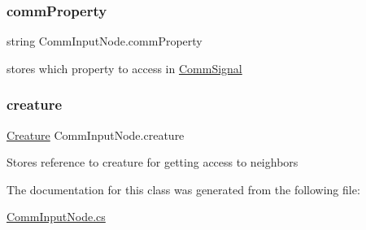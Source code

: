 \subsubsection{\texorpdfstring{comm\+Property}{commProperty}}
{\footnotesize\ttfamily string Comm\+Input\+Node.\+comm\+Property}



stores which property to access in \mbox{\hyperlink{class_comm_signal}{Comm\+Signal}} 

\mbox{\label{class_comm_input_node_ac72fbeea2e0341d3caaddd99f9a71cb6}} 
\subsubsection{\texorpdfstring{creature}{creature}}
{\footnotesize\ttfamily \mbox{\hyperlink{class_creature}{Creature}} Comm\+Input\+Node.\+creature}



Stores reference to creature for getting access to neighbors 



The documentation for this class was generated from the following file\+:\begin{DoxyCompactItemize}
\item 
\mbox{\hyperlink{_comm_input_node_8cs}{Comm\+Input\+Node.\+cs}}\end{DoxyCompactItemize}
